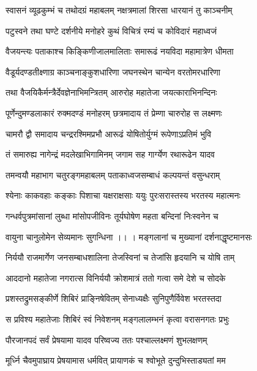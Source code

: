 \twolineshloka
{स्वासनं व्यूढकुम्भं च तथोदग्रं महाबलम्}
{नक्षत्रमालां शिरसा धारयानं तु काञ्चनीम्}%

\twolineshloka
{पटुस्वने तथा घण्टे दर्शनीये मनोहरे}
{कुथं विचित्रं रम्यं च कोविदारं महाध्वजं}%

\twolineshloka
{वैजयन्त्यः पताकाश्च किङ्किणीजालमालिताः}
{समारूढं नयविदा महामात्रेण धीमता}%

\twolineshloka
{वैडूर्यदण्डतीक्ष्णाग्र काञ्चनाङ्कुशधारिणा}
{जघनस्थेन चान्येन वरतोमरधारिणा}%

\twolineshloka
{तथा वैजयिकैर्मन्त्रैर्देवज्ञेनाभिमन्त्रितम्}
{आरुरोह महातेजा जयत्काराभिनन्दिनः}%

\twolineshloka
{पूर्णेन्दुमण्डलाकारं रुक्मदण्डं मनोहरम्}
{छत्रमादाय तं प्रेम्णा चारुरोह स लक्ष्मणः}%

\twolineshloka
{चामरौ द्वौ समादाय चन्द्ररश्मिमप्रभौ}
{आरूढं योषितोर्युग्मं रूपेणाऽप्रतिमं भुवि} %

\twolineshloka
{तं समारुह्य नागेन्द्रं मदलेखाभिगामिनम्}
{जगाम सह गार्ग्येण रथारूढेन यादव}%

\twolineshloka
{तमन्वयौ महाभाग चतुरङ्गमहाबलम्}
{पताकाध्वजसम्बाधं कल्पयन्तं वसुन्धराम्}%

\twolineshloka
{श्येनाः काकवहाः कङ्काः पिशाचा यक्षराक्षसाः}
{ययुः पुरःसरास्तस्य भरतस्य महात्मनः}%

\twolineshloka
{गन्धर्वपुत्रमांसानां लुब्धा मांसोपजीविनः}
{तूर्यघोषेण महता बन्दिनां निःस्वनेन च}%

\twolineshloka
{वायुना चानुलोमेन सेव्यमानः सुगन्धिना ।। ।}
{मङ्गलानां च मुख्यानां दर्शनाद्धृष्टमानसः}%

\twolineshloka
{निर्ययौ राजमार्गेण जनसम्बाधशालिना}
{तेजस्विनां च तेजांसि हृदयानि च योषि ताम्}%

\twolineshloka
{आददानो महातेजा नगरात्स विनिर्ययौ}
{क्रोशमात्रं ततो गत्वा समे देशे च सोदके}%

\twolineshloka
{प्रशस्तद्रुमसङ्कीर्णे शिबिरं प्राङ्निषेवितम्}
{सेनाध्यक्षैः सुनिपुणैर्विवेश भरतस्तदा}%

\twolineshloka
{स प्रविश्य महातेजाः शिबिरं स्वं निवेशनम्}
{मङ्गलालम्भनं कृत्वा वरासनगतः प्रभुः}%

\twolineshloka
{पौरजानपदं सर्वं प्रेषयामा यादव}
{परिष्वज्य ततः पश्चाल्लक्ष्मणं शुभलक्षणम्} %

\twolineshloka
{मूर्ध्नि चैवमुपाघ्राय प्रेषयामास धर्मवित्}
{प्रायाणकं च श्वोभूते दुन्दुभिस्ताड्यतां मम}%

